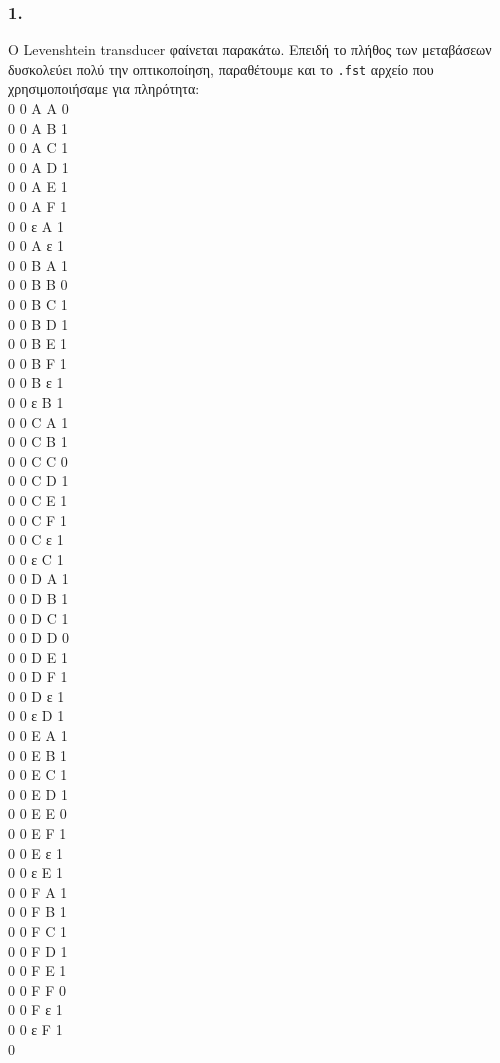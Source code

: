 \documentclass[12pt,a4paper]{article}
\begin{document}
		\subsubsection*{1.} 
			Ο Levenshtein transducer φαίνεται παρακάτω. Επειδή το πλήθος των μεταβάσεων δυσκολεύει πολύ την οπτικοποίηση, παραθέτουμε και το \verb|.fst| αρχείο που χρησιμοποιήσαμε για πληρότητα: \\
			
			0 0 A A 0 \\
			0 0 A B 1 \\
			0 0 A C 1 \\
			0 0 A D 1 \\
			0 0 A E 1 \\
			0 0 A F 1 \\
			0 0 ε A 1 \\
			0 0 A ε 1 \\
			0 0 B A 1 \\
			0 0 B B 0 \\
			0 0 B C 1 \\
			0 0 B D 1 \\
			0 0 B E 1 \\
			0 0 B F 1 \\
			0 0 B ε 1 \\
			0 0 ε B 1 \\
			0 0 C A 1 \\
			0 0 C B 1 \\
			0 0 C C 0 \\
			0 0 C D 1 \\
			0 0 C E 1 \\
			0 0 C F 1 \\
			0 0 C ε 1 \\
			0 0 ε C 1 \\
			0 0 D A 1 \\
			0 0 D B 1 \\
			0 0 D C 1 \\
			0 0 D D 0 \\
			0 0 D E 1 \\
			0 0 D F 1 \\
			0 0 D ε 1 \\
			0 0 ε D 1 \\
			0 0 E A 1 \\
			0 0 E B 1 \\
			0 0 E C 1 \\
			0 0 E D 1 \\
			0 0 E E 0 \\
			0 0 E F 1 \\
			0 0 E ε 1 \\
			0 0 ε E 1 \\
			0 0 F A 1 \\
			0 0 F B 1 \\
			0 0 F C 1 \\
			0 0 F D 1 \\
			0 0 F E 1 \\
			0 0 F F 0 \\
			0 0 F ε 1 \\
			0 0 ε F 1 \\
			0 \\
			
\end{document}
